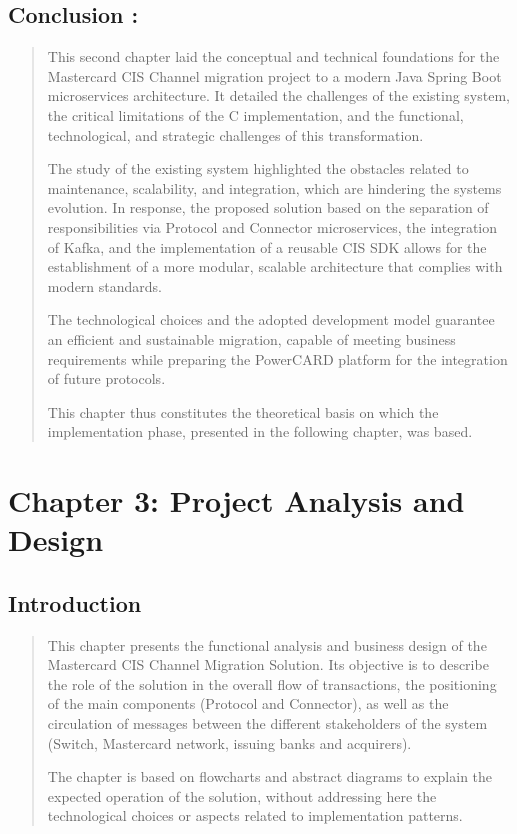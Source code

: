 \documentclass[12pt,a4paper]{report}
\begin{document}
\subsection{Conclusion : }
\begin{quote}
This second chapter laid the conceptual and technical foundations for
the Mastercard CIS Channel migration project to a modern Java Spring
Boot microservices architecture. It detailed the challenges of the
existing system, the critical limitations of the C implementation, and
the functional, technological, and strategic challenges of this
transformation.

The study of the existing system highlighted the obstacles related to
maintenance, scalability, and integration, which are hindering the
system\textquotesingle s evolution. In response, the proposed solution
based on the separation of responsibilities via Protocol and Connector
microservices, the integration of Kafka, and the implementation of a
reusable CIS SDK allows for the establishment of a more modular,
scalable architecture that complies with modern standards.

The technological choices and the adopted development model guarantee an
efficient and sustainable migration, capable of meeting business
requirements while preparing the PowerCARD platform for the integration
of future protocols.

This chapter thus constitutes the theoretical basis on which the
implementation phase, presented in the following chapter, was based.
\end{quote}
\clearpage

\section{Chapter 3: Project Analysis and Design}

\subsection{Introduction}
\begin{quote}
This chapter presents the functional analysis and business design of the
Mastercard CIS Channel Migration Solution. Its objective is to describe
the role of the solution in the overall flow of transactions, the
positioning of the main components (Protocol and Connector), as well as
the circulation of messages between the different stakeholders of the
system (Switch, Mastercard network, issuing banks and acquirers).

The chapter is based on flowcharts and abstract diagrams to explain the
expected operation of the solution, without addressing here the
technological choices or aspects related to implementation patterns.
\end{quote}
\end{document}
